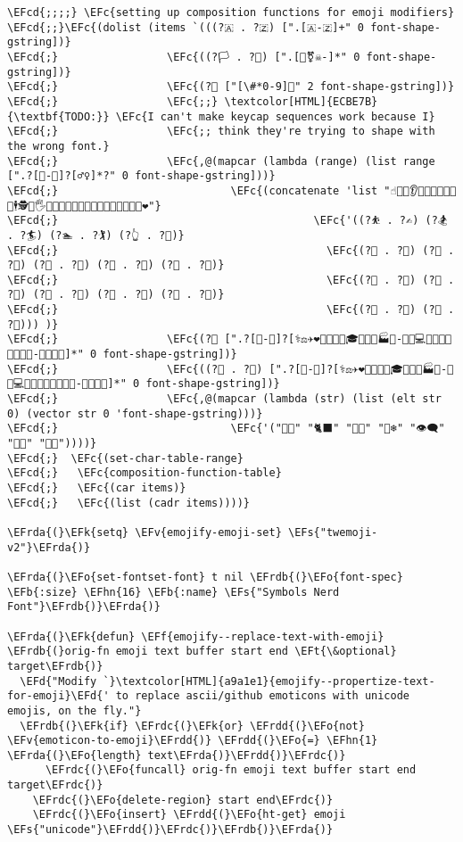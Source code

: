 \documentclass[a4wide,10pt]{article}
\newcommand{\EFc}[1]{\textcolor{EFc}{#1}} %
\newcommand{\EFcd}[1]{\textcolor{EFcd}{#1}} %
\newcommand{\EFs}[1]{\textcolor{EFs}{#1}} %
\newcommand{\EFd}[1]{\textcolor{EFd}{#1}} %
\newcommand{\EFk}[1]{\textcolor{EFk}{#1}} %
\newcommand{\EFb}[1]{\textcolor{EFb}{#1}} %
\newcommand{\EFf}[1]{\textcolor{EFf}{#1}} %
\newcommand{\EFv}[1]{\textcolor{EFv}{#1}} %
\newcommand{\EFt}[1]{\textcolor{EFt}{#1}} %
\newcommand{\EFo}[1]{\textcolor{EFo}{#1}} %
\newcommand{\EFhn}[1]{\textcolor{EFhn}{\textbf{#1}}} %
\newcommand{\EFrda}[1]{\textcolor{EFrda}{#1}} %
\newcommand{\EFrdb}[1]{\textcolor{EFrdb}{#1}} %
\newcommand{\EFrdc}[1]{\textcolor{EFrdc}{#1}} %
\newcommand{\EFrdd}[1]{\textcolor{EFrdd}{#1}} %
\begin{document}
\begin{Code}
\begin{Verbatim}
\EFcd{;;;;} \EFc{setting up composition functions for emoji modifiers}
\EFcd{;;}\EFc{(dolist (items `(((?🇦 . ?🇿) [".[🇦-🇿]+" 0 font-shape-gstring])}
\EFcd{;}                 \EFc{((?🏳 . ?🏴) [".[️‍🌈⚧☠󠀠-󠁿]*" 0 font-shape-gstring])}
\EFcd{;}                 \EFc{(?⃣ ["[\#*0-9]️⃣" 2 font-shape-gstring])}
\EFcd{;}                 \EFc{;;} \textcolor[HTML]{ECBE7B}{\textbf{TODO:}} \EFc{I can't make keycap sequences work because I}
\EFcd{;}                 \EFc{;; think they're trying to shape with the wrong font.}
\EFcd{;}                 \EFc{,@(mapcar (lambda (range) (list range [".‍?[🏻-🏿]?[‍️♂♀]*️?" 0 font-shape-gstring]))}
\EFcd{;}                           \EFc{(concatenate 'list "☝🎅🏇👂👃👦👧👼💏💑💪🕴🕵🕺🖐🖕🖖🙇🚣🛀🛌🤏🤞🤟🤦🤽🤾🥷🦻👯❤"}
\EFcd{;}                                        \EFc{'((?⛹ . ?✍) (?🏂 . ?🏄) (?🏊 . ?🏌) (?👆 . ?👐)}
\EFcd{;}                                          \EFc{(?👫 . ?👮) (?👰 . ?👸) (?💁 . ?💇) (?🙅 . ?🙇) (?🙋 . ?🙏)}
\EFcd{;}                                          \EFc{(?🚴 . ?🚶) (?🤘 . ?🤜) (?🤰 . ?🤹) (?🤼 . ?🤾) (?🦵 . ?🦹)}
\EFcd{;}                                          \EFc{(?🧍 . ?🧏) (?🧒 . ?🧟))) )}
\EFcd{;}                 \EFc{(?🧑 [".‍?[🏻-🏿]?[‍⚕⚖✈❤️🌾🍳🍼🎄🎓🎤🎨🏫🏭👦-👩💋💻💼🔧🔬🚀🚒🤝🦯🦰-🦳🦼🦽🧑]*" 0 font-shape-gstring])}
\EFcd{;}                 \EFc{((?👨 . ?👩) [".‍?[🏻-🏿]?[‍⚕⚖✈❤️🌾🍳🍼🎄🎓🎤🎨🏫🏭👦-👩💋💻💼🔧🔬🚀🚒🤝🦯🦰-🦳🦼🦽🧑]*" 0 font-shape-gstring])}
\EFcd{;}                 \EFc{,@(mapcar (lambda (str) (list (elt str 0) (vector str 0 'font-shape-gstring)))}
\EFcd{;}                           \EFc{'("😶‍🌫️" "🐈‍⬛" "🐕‍🦺" "🐻‍❄️" "👁️‍🗨️" "😮‍💨" "😵‍💫"))))}
\EFcd{;}  \EFc{(set-char-table-range}
\EFcd{;}   \EFc{composition-function-table}
\EFcd{;}   \EFc{(car items)}
\EFcd{;}   \EFc{(list (cadr items))))}

\EFrda{(}\EFk{setq} \EFv{emojify-emoji-set} \EFs{"twemoji-v2"}\EFrda{)}

\EFrda{(}\EFo{set-fontset-font} t nil \EFrdb{(}\EFo{font-spec} \EFb{:size} \EFhn{16} \EFb{:name} \EFs{"Symbols Nerd Font"}\EFrdb{)}\EFrda{)}

\EFrda{(}\EFk{defun} \EFf{emojify--replace-text-with-emoji} \EFrdb{(}orig-fn emoji text buffer start end \EFt{\&optional} target\EFrdb{)}
  \EFd{"Modify `}\textcolor[HTML]{a9a1e1}{emojify--propertize-text-for-emoji}\EFd{' to replace ascii/github emoticons with unicode emojis, on the fly."}
  \EFrdb{(}\EFk{if} \EFrdc{(}\EFk{or} \EFrdd{(}\EFo{not} \EFv{emoticon-to-emoji}\EFrdd{)} \EFrdd{(}\EFo{=} \EFhn{1} \EFrda{(}\EFo{length} text\EFrda{)}\EFrdd{)}\EFrdc{)}
      \EFrdc{(}\EFo{funcall} orig-fn emoji text buffer start end target\EFrdc{)}
    \EFrdc{(}\EFo{delete-region} start end\EFrdc{)}
    \EFrdc{(}\EFo{insert} \EFrdd{(}\EFo{ht-get} emoji \EFs{"unicode"}\EFrdd{)}\EFrdc{)}\EFrdb{)}\EFrda{)}


\end{Verbatim}
\end{Code}
\end{document}
